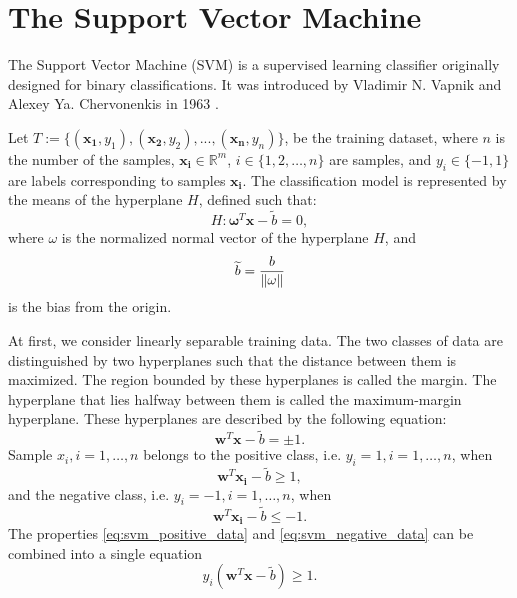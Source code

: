 \section{The Support Vector Machine}
The Support Vector Machine (SVM) is a supervised learning classifier originally designed for binary classifications. It was introduced by Vladimir N. Vapnik and Alexey Ya. Chervonenkis in 1963 \cite{Cortes1995}.

Let \( T := \{(\boldsymbol{x_1}, y_1),(\boldsymbol{x_2}, y_2),...,(\boldsymbol{x_n}, y_n)\} \),
be the training dataset, where $n$ is the number of the samples, \( \boldsymbol{x_i} \in \mathbb{R}^m \), \( i \in \{1,2,\dots,n\} \)
are samples, and \( y_i \in \{-1, 1\} \) are labels corresponding to samples \( \boldsymbol{x_i} \). The classification model is represented by the means of the hyperplane \( H \), defined such that:
\begin{equation}
    H: \boldsymbol{\omega}^T\boldsymbol{x}-\widetilde{b}=0,
    \label{eq:svm:hyperplane}
\end{equation}
where \( \omega \) is the normalized normal vector of the hyperplane \( H \), and
\begin{equation}
    \widetilde{b} = \frac{b}{\left\lVert\omega\right\rVert}
    \label{eq:svm:offset}
\end{equation}
is the bias from the origin.

At first, we consider linearly separable training data. The two classes of data are distinguished by two hyperplanes such that the distance between them is maximized. The region bounded by these hyperplanes is called the margin. The hyperplane that lies halfway between them is called the maximum-margin hyperplane. These hyperplanes are described by the following equation:
\begin{equation}
    \boldsymbol{w}^T\boldsymbol{x}-\widetilde{b}=\pm1.
    \label{eq:svm_hyperplanes}
\end{equation}
Sample $x_i, i=1,\dots,n$ belongs to the positive class, i.e. $y_i = 1, i=1,\dots,n$, when
\begin{equation}
    \boldsymbol{w}^T\boldsymbol{x_i}-\widetilde{b}\geq1,
    \label{eq:svm_positive_data}
\end{equation}
and the negative class, i.e. $y_i = -1, i=1,\dots,n$, when
\begin{equation}
    \boldsymbol{w}^T\boldsymbol{x_i}-\widetilde{b}\leq-1.
    \label{eq:svm_negative_data}
\end{equation}
The properties \eqref{eq:svm_positive_data} and \eqref{eq:svm_negative_data} can be combined into a single equation
\begin{equation}
    y_i(\boldsymbol{w}^T\boldsymbol{x}-\widetilde{b})\geq1.
\end{equation}

